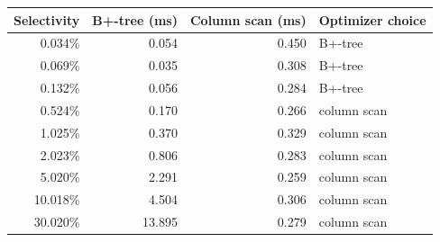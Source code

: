 \begin{tabular}{rrrl}
\toprule
Selectivity & B+-tree (ms) & Column scan (ms) & Optimizer choice \\
\midrule
0.034\% & 0.054 & 0.450 & B+-tree \\
0.069\% & 0.035 & 0.308 & B+-tree \\
0.132\% & 0.056 & 0.284 & B+-tree \\
0.524\% & 0.170 & 0.266 & column scan \\
1.025\% & 0.370 & 0.329 & column scan \\
2.023\% & 0.806 & 0.283 & column scan \\
5.020\% & 2.291 & 0.259 & column scan \\
10.018\% & 4.504 & 0.306 & column scan \\
30.020\% & 13.895 & 0.279 & column scan \\
\bottomrule
\end{tabular}
